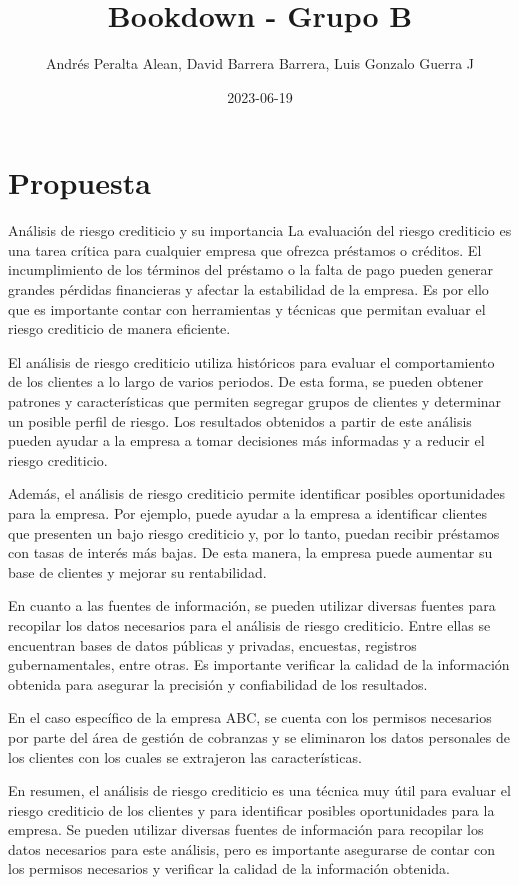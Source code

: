 \documentclass[
]{book}
\title{Bookdown - Grupo B}
\author{Andrés Peralta Alean, David Barrera Barrera, Luis Gonzalo Guerra J}
\date{2023-06-19}
\begin{document}
\maketitle

{
\setcounter{tocdepth}{1}
\tableofcontents
}
\hypertarget{propuesta}{%
\chapter{Propuesta}\label{propuesta}}

Análisis de riesgo crediticio y su importancia La evaluación del riesgo crediticio es una tarea crítica para cualquier empresa que ofrezca préstamos o créditos.
El incumplimiento de los términos del préstamo o la falta de pago pueden generar grandes pérdidas financieras y afectar la estabilidad de la empresa.
Es por ello que es importante contar con herramientas y técnicas que permitan evaluar el riesgo crediticio de manera eficiente.

El análisis de riesgo crediticio utiliza históricos para evaluar el comportamiento de los clientes a lo largo de varios periodos.
De esta forma, se pueden obtener patrones y características que permiten segregar grupos de clientes y determinar un posible perfil de riesgo.
Los resultados obtenidos a partir de este análisis pueden ayudar a la empresa a tomar decisiones más informadas y a reducir el riesgo crediticio.

Además, el análisis de riesgo crediticio permite identificar posibles oportunidades para la empresa.
Por ejemplo, puede ayudar a la empresa a identificar clientes que presenten un bajo riesgo crediticio y, por lo tanto, puedan recibir préstamos con tasas de interés más bajas.
De esta manera, la empresa puede aumentar su base de clientes y mejorar su rentabilidad.

En cuanto a las fuentes de información, se pueden utilizar diversas fuentes para recopilar los datos necesarios para el análisis de riesgo crediticio.
Entre ellas se encuentran bases de datos públicas y privadas, encuestas, registros gubernamentales, entre otras.
Es importante verificar la calidad de la información obtenida para asegurar la precisión y confiabilidad de los resultados.

En el caso específico de la empresa ABC, se cuenta con los permisos necesarios por parte del área de gestión de cobranzas y se eliminaron los datos personales de los clientes con los cuales se extrajeron las características.

En resumen, el análisis de riesgo crediticio es una técnica muy útil para evaluar el riesgo crediticio de los clientes y para identificar posibles oportunidades para la empresa.
Se pueden utilizar diversas fuentes de información para recopilar los datos necesarios para este análisis, pero es importante asegurarse de contar con los permisos necesarios y verificar la calidad de la información obtenida.
\end{document}
